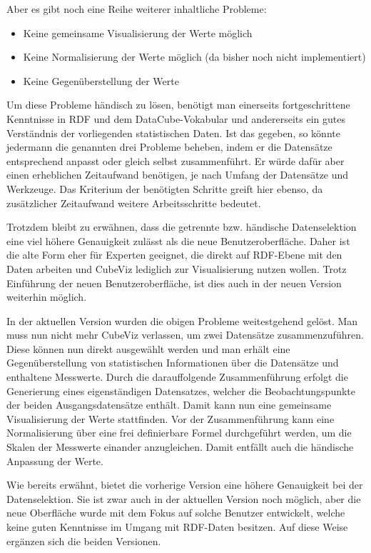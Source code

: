 \documentclass[11pt]{article}
\newcommand{\com}[1]{\marginpar{\em {\small{#1}}}} %
\begin{document}
\noindent 
Aber es gibt noch eine Reihe weiterer inhaltliche Probleme:

\begin{itemize}
    \item Keine gemeinsame Visualisierung der Werte möglich
    \item Keine Normalisierung der Werte möglich (da bisher noch nicht implementiert)
    \item Keine Gegenüberstellung der Werte 
\end{itemize}

\noindent
Um diese Probleme händisch zu lösen, benötigt man einerseits fortgeschrittene Kenntnisse in RDF und dem DataCube-Vokabular und andererseits ein gutes Verständnis der vorliegenden statistischen Daten. Ist das gegeben, so könnte jedermann die genannten drei Probleme beheben, indem er die Datensätze entsprechend anpasst oder gleich selbst zusammenführt. Er würde dafür aber einen erheblichen Zeitaufwand benötigen, je nach Umfang der Datensätze und Werkzeuge. Das Kriterium der benötigten Schritte greift hier ebenso, da zusätzlicher Zeitaufwand weitere Arbeitsschritte bedeutet. 

Trotzdem bleibt zu erwähnen, dass die getrennte bzw. händische Datenselektion eine viel höhere Genauigkeit\com{Höhere Genauigkeit} zulässt als die neue Benutzeroberfläche. Daher ist die alte Form eher für Experten geeignet, die direkt auf RDF-Ebene mit den Daten arbeiten und CubeViz lediglich zur Visualisierung nutzen wollen. Trotz Einführung der neuen Benutzeroberfläche, ist dies auch in der neuen Version weiterhin möglich.

In der aktuellen Version\com{Aktuelle \\ Version} wurden die obigen Probleme weitestgehend gelöst. Man muss nun nicht mehr CubeViz verlassen, um zwei Datensätze zusammenzuführen. Diese können nun direkt ausgewählt werden und man erhält eine Gegenüberstellung von statistischen Informationen über die Datensätze und enthaltene Messwerte. Durch die darauffolgende Zusammenführung erfolgt die Generierung eines eigenständigen Datensatzes, welcher die Beobachtungspunkte der beiden Ausgangsdatensätze enthält. Damit kann nun eine gemeinsame Visualisierung der Werte stattfinden. Vor der Zusammenführung kann eine Normalisierung über eine frei definierbare Formel durchgeführt werden, um die Skalen der Messwerte einander anzugleichen. Damit entfällt auch die händische Anpassung der Werte.

Wie bereits erwähnt, bietet die vorherige Version eine höhere Genauigkeit bei der Datenselektion. Sie ist zwar auch in der aktuellen Version noch möglich, aber die neue Oberfläche wurde mit dem Fokus auf solche Benutzer entwickelt, welche keine guten Kenntnisse im Umgang mit RDF-Daten besitzen. Auf diese Weise ergänzen sich die beiden Versionen.
\end{document}
